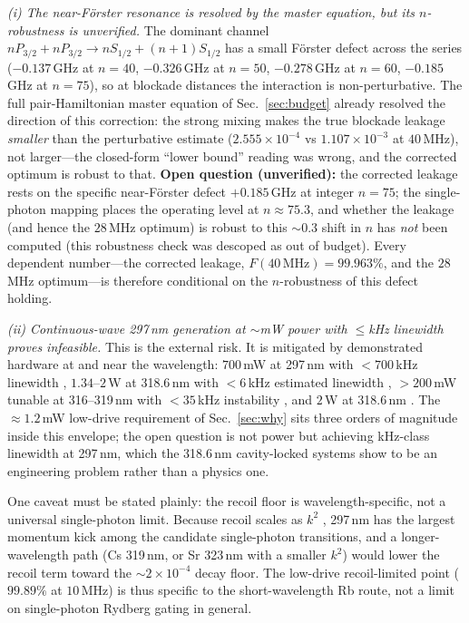 \documentclass[twocolumn]{article}
\begin{document}
\textit{(i) The near-F\"orster resonance is resolved by the master equation, but its $n$-robustness is unverified.} The dominant channel $nP_{3/2}+nP_{3/2}\rightarrow nS_{1/2}+(n{+}1)S_{1/2}$ has a small F\"orster defect across the series ($-0.137$\,GHz at $n=40$, $-0.326$\,GHz at $n=50$, $-0.278$\,GHz at $n=60$, $-0.185$\,GHz at $n=75$), so at blockade distances the interaction is non-perturbative. The full pair-Hamiltonian master equation of Sec.~\ref{sec:budget} already resolved the direction of this correction: the strong mixing makes the true blockade leakage \emph{smaller} than the perturbative estimate ($2.555\times10^{-4}$ vs $1.107\times10^{-3}$ at $40$\,MHz), not larger---the closed-form ``lower bound'' reading was wrong, and the corrected optimum is robust to that. \textbf{Open question (unverified):} the corrected leakage rests on the specific near-F\"orster defect $+0.185$\,GHz at integer $n=75$; the single-photon mapping places the operating level at $n\approx75.3$, and whether the leakage (and hence the $28$\,MHz optimum) is robust to this $\sim0.3$ shift in $n$ has \emph{not} been computed (this robustness check was descoped as out of budget). Every dependent number---the corrected leakage, $F(40\,\mathrm{MHz})=99.963\%$, and the $28$\,MHz optimum---is therefore conditional on the $n$-robustness of this defect holding.

\textit{(ii) Continuous-wave 297\,nm generation at $\sim$mW power with $\le$kHz linewidth proves infeasible.} This is the external risk. It is mitigated by demonstrated hardware at and near the wavelength: $700$\,mW at 297\,nm with $<700$\,kHz linewidth \cite{Manthey2014}, $1.34$--$2$\,W at 318.6\,nm with $<6$\,kHz estimated linewidth \cite{Bai2016,Bai2018}, $>200$\,mW tunable at 316--319\,nm with $<35$\,kHz instability \cite{Bridge2015}, and $2$\,W at 318.6\,nm \cite{Wang2017}. The $\approx1.2$\,mW low-drive requirement of Sec.~\ref{sec:why} sits three orders of magnitude inside this envelope; the open question is not power but achieving kHz-class linewidth at 297\,nm, which the 318.6\,nm cavity-locked systems \cite{Bai2016,Bridge2015} show to be an engineering problem rather than a physics one.

One caveat must be stated plainly: the recoil floor is wavelength-specific, not a universal single-photon limit. Because recoil scales as $k^2$ \cite{Robicheaux2021}, 297\,nm has the largest momentum kick among the candidate single-photon transitions, and a longer-wavelength path (Cs 319\,nm, or Sr 323\,nm with a smaller $k^2$) would lower the recoil term toward the $\sim2\times10^{-4}$ decay floor. The low-drive recoil-limited point ($99.89\%$ at $10$\,MHz) is thus specific to the short-wavelength Rb route, not a limit on single-photon Rydberg gating in general.
\end{document}
